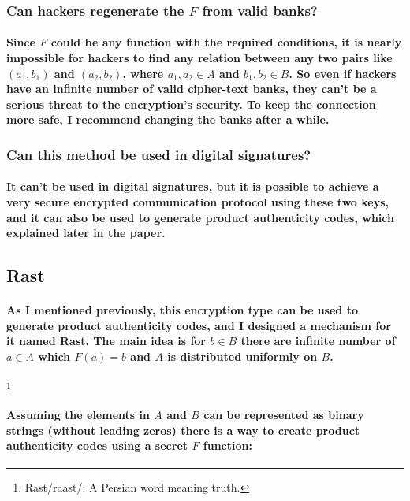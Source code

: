 \documentclass[oneside]{book}
\newcommand{\myparagraph}[1]{\paragraph{\textnormal{#1}}}
\begin{document}
\subsubsection*{Can hackers regenerate the $F$ from valid banks?}

\myparagraph{
Since $F$ could be any function with the required conditions, it is nearly impossible for hackers to find any relation between any two pairs like $(a_1, b_1)$ and $(a_2, b_2)$, where $a_1, a_2 \in A$ and $b_1, b_2 \in B$. So even if hackers have an infinite number of valid cipher-text banks, they can't be a serious threat to the encryption's security. To keep the connection more safe, I recommend changing the banks after a while.
}

\subsubsection{Can this method be used in digital signatures?}

\myparagraph{
It can't be used in digital signatures, but it is possible to achieve a very secure encrypted communication protocol using these two keys, and it can also be used to generate product authenticity codes, which explained later in the paper.
}

\subsection{Rast}

\myparagraph{
As I mentioned previously, this encryption type can be used to generate product authenticity codes, and I designed a mechanism for it named \textbf{Rast}. The main idea is for $b \in B$ there are infinite number of $a \in A$ which $F(a) = b$ and $A$ is distributed uniformly on $B$.
}
\footnote{Rast/raast/: A Persian word meaning truth.}

\myparagraph{
Assuming the elements in $A$ and $B$ can be represented as binary strings (without leading zeros) there is a way to create product authenticity codes using a secret $F$ function:
}
\end{document}
